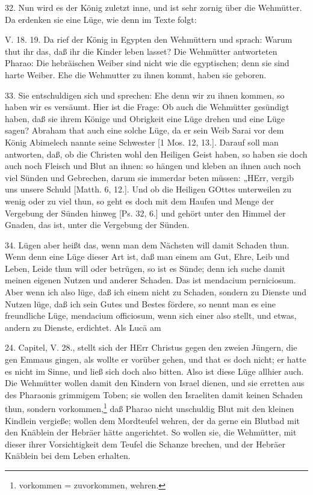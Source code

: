 32. Nun wird es der König zuletzt inne, und ist sehr zornig über die Wehmütter. Da erdenken sie eine Lüge, wie denn im Texte folgt:

\begin{schriftzitat}
V. 18. 19. Da rief der König in Egypten den Wehmüttern und sprach: Warum thut ihr das, daß ihr die Kinder leben lasset? Die Wehmütter antworteten Pharao: Die hebräischen Weiber sind nicht wie die egyptischen; denn sie sind harte Weiber. Ehe die Wehmutter zu ihnen kommt, haben sie geboren.
\end{schriftzitat}

33. Sie entschuldigen sich und sprechen: Ehe denn wir zu ihnen kommen, so haben wir es versäumt. Hier ist die Frage: Ob auch die Wehmütter gesündigt haben, daß sie ihrem Könige und Obrigkeit eine Lüge drehen und eine Lüge sagen? Abraham that auch eine solche Lüge, da er sein Weib Sarai vor dem König Abimelech nannte seine Schwester [1 Mos. 12, 13.]. Darauf soll man antworten, daß, ob die Christen wohl den Heiligen Geist haben, so haben sie doch auch noch Fleisch und Blut an ihnen: so hängen und kleben an ihnen auch noch viel Sünden und Gebrechen, darum sie immerdar beten müssen: „HErr, vergib uns unsere Schuld [Matth. 6, 12.]. Und ob die Heiligen GOttes unterweilen zu wenig oder zu viel thun, so geht es doch mit dem Haufen und Menge der Vergebung der Sünden hinweg [Ps. 32, 6.] und gehört unter den Himmel der Gnaden, das ist, unter die Vergebung der Sünden.

34. Lügen aber heißt das, wenn man dem Nächsten will damit Schaden thun. Wenn denn eine Lüge dieser Art ist, daß man einem am Gut, Ehre, Leib und Leben, Leide thun will oder betrügen, so ist es Sünde; denn ich suche damit meinen eigenen Nutzen und anderer Schaden. Das ist mendacium perniciosum. Aber wenn ich also lüge, daß ich einem nicht zu Schaden, sondern zu Dienste und Nutzen lüge, daß ich sein Gutes und Bestes fördere, so nennt man es eine freundliche Lüge, mendacium officiosum, wenn sich einer also stellt, und etwas, andern zu Dienste, erdichtet. Als Lucä am

24. Capitel, V. 28., stellt sich der HErr Christus gegen den zweien Jüngern, die gen Emmaus gingen, als wollte er vorüber gehen, und that es doch nicht; er hatte es nicht im Sinne, und ließ sich doch also bitten. Also ist diese Lüge allhier auch. Die Wehmütter wollen damit den Kindern von Israel dienen, und sie erretten aus des Pharaonis grimmigem Toben; sie wollen den Israeliten damit keinen Schaden thun, sondern vorkommen,\footnote{vorkommen = zuvorkommen, wehren.} daß Pharao nicht unschuldig Blut mit den kleinen Kindlein vergieße; wollen dem Mordteufel wehren, der da gerne ein Blutbad mit den Knäblein der Hebräer hätte angerichtet. So wollen sie, die Wehmütter, mit dieser ihrer Vorsichtigkeit dem Teufel die Schanze brechen, und der Hebräer Knäblein bei dem Leben erhalten.

